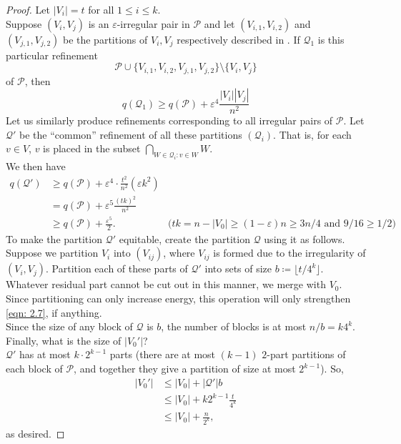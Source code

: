 			\begin{proof}
				Let $|V_i| = t$ for all $1\le i\le k$.\\
				Suppose $(V_i,V_j)$ is an $\varepsilon$-irregular pair in $\mathcal{P}$ and let $(V_{i,1},V_{i,2})$ and $(V_{j,1},V_{j,2})$ be the partitions of $V_i,V_j$ respectively described in . If $\mathcal{Q}_1$ is this particular refinement
				\[ \mathcal{P} \cup \{V_{i,1},V_{i,2},V_{j,1},V_{j,2}\} \setminus \{V_i,V_j\} \]
				of $\mathcal{P}$, then
				\[ q(\mathcal{Q}_1) \ge q(\mathcal{P}) + \varepsilon^4 \frac{|V_i||V_j|}{n^2} \]
				Let us similarly produce refinements corresponding to all irregular pairs of $\mathcal{P}$. Let $\mathcal{Q}'$ be the ``common'' refinement of all these partitions $(\mathcal{Q}_i)$. That is, for each $v \in V$, $v$ is placed in the subset $\bigcap_{W \in \mathcal{Q}_i : v \in W} W$.\\
				We then have
				\begin{align}
					q(\mathcal{Q}') &\ge q(\mathcal{P}) + \varepsilon^4 \cdot \frac{t^2}{n^2} (\varepsilon k^2) \nonumber \\
					&= q(\mathcal{P}) + \varepsilon^5 \frac{(tk)^2}{n^2} \nonumber \\
					&\ge q(\mathcal{P}) + \frac{\varepsilon^5}{2}. & \text{($tk = n - |V_0| \ge (1-\varepsilon)n \ge 3n/4$ and $9/16 \ge 1/2$)} \label{eqn: 2.7}
				\end{align}
				To make the partition $\mathcal{Q}'$ equitable, create the partition $\mathcal{Q}$ using it as follows.\\
				Suppose we partition $V_i$ into $(V_{ij})$, where $V_{ij}$ is formed due to the irregularity of $(V_i,V_j)$. Partition each of these parts of $\mathcal{Q}'$ into sets of size $b\coloneqq \lfloor t/4^k\rfloor$. Whatever residual part cannot be cut out in this manner, we merge with $V_0$.\\
				Since partitioning can only increase energy, this operation will only strengthen \eqref{eqn: 2.7}, if anything.\\

				Since the size of any block of $\mathcal{Q}$ is $b$, the number of blocks is at most $n/b = k 4^k$.\\
				Finally, what is the size of $|V_0'|$?\\
				$\mathcal{Q}'$ has at most $k\cdot 2^{k-1}$ parts (there are at most $(k-1)$ $2$-part partitions of each block of $\mathcal{P}$, and together they give a partition of size at most $2^{k-1}$). So,\\
				\begin{align*}
					|V_0'| &\le |V_0| + |\mathcal{Q}'| b \\
					&\le |V_0| + k 2^{k-1} \frac{t}{4^k} \\
					&\le |V_0| + \frac{n}{2^k},
				\end{align*}
				as desired.
			\end{proof}

